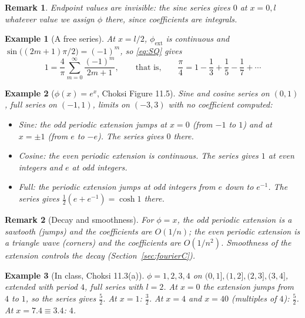 \documentclass{article}
\newtheorem*{example}{Example}
\newtheorem{remark}{Remark}
\begin{document}
\begin{remark}
    Endpoint values are invisible: the sine series gives $0$ at $x = 0, l$ whatever value we assign $\phi$ there, since coefficients are integrals.
\end{remark}
\begin{example}[A free series]
    At $x = l/2$, $\phi_{\text{ext}}$ is continuous and $\sin\big((2m+1)\pi/2\big) = (-1)^m$, so \eqref{eq:SQ} gives
    \begin{equation}
        1 = \frac{4}{\pi}\sum_{m=0}^\infty\frac{(-1)^m}{2m+1}, \qquad \text{that is,} \qquad \frac{\pi}{4} = 1 - \frac13 + \frac15 - \frac17 + \cdots
    \end{equation}
\end{example}
\begin{example}[$\phi(x) = e^x$, Choksi Figure 11.5]
    Sine and cosine series on $(0,1)$, full series on $(-1,1)$, limits on $(-3,3)$ with no coefficient computed:
    \begin{itemize}
        \item Sine: the odd periodic extension jumps at $x = 0$ (from $-1$ to $1$) and at $x = \pm1$ (from $e$ to $-e$). The series gives $0$ there.
        \item Cosine: the even periodic extension is continuous. The series gives $1$ at even integers and $e$ at odd integers.
        \item Full: the periodic extension jumps at odd integers from $e$ down to $e^{-1}$. The series gives $\frac12(e + e^{-1}) = \cosh 1$ there.
    \end{itemize}
\end{example}
\begin{remark}[Decay and smoothness]
    For $\phi = x$, the odd periodic extension is a sawtooth (jumps) and the coefficients are $O(1/n)$; the even periodic extension is a triangle wave (corners) and the coefficients are $O(1/n^2)$. Smoothness of the extension controls the decay (Section~\ref{sec:fourierC}).
\end{remark}
\begin{example}[In class, Choksi 11.3(a)]
    $\phi = 1, 2, 3, 4$ on $(0,1], (1,2], (2,3], (3,4]$, extended with period $4$, full series with $l = 2$. At $x = 0$ the extension jumps from $4$ to $1$, so the series gives $\frac52$. At $x = 1$: $\frac32$. At $x = 4$ and $x = 40$ (multiples of $4$): $\frac52$. At $x = 7.4 \equiv 3.4$: $4$.
\end{example}
\end{document}
